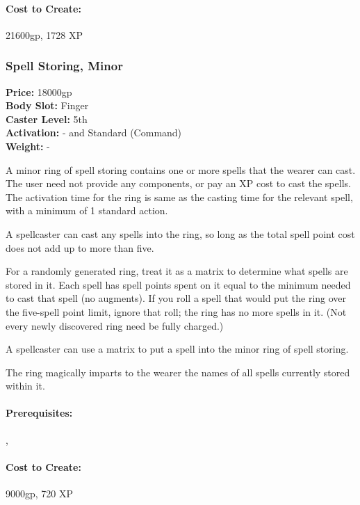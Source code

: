 \paragraph{Cost to Create:} 21600gp, 1728 XP
\subsubsection{Spell Storing, Minor}
\label{Item:SpellStoringMinor}
   \textbf{Price:} 18000gp
\\ \textbf{Body Slot:} Finger
\\ \textbf{Caster Level:} 5th
\\ \textbf{Activation:} - and Standard (Command)
\\ \textbf{Weight:} -

A minor ring of spell storing contains one or more spells that the wearer can cast.  
The user need not provide any components, or pay an XP cost to cast the spells. 
The activation time for the ring is same as the casting time for the relevant spell, with a minimum of 1 standard action.

A spellcaster can cast any spells into the ring, so long as the total spell point cost does not add up to more than five. 

For a randomly generated ring, treat it as a matrix to determine what spells are stored in it. Each spell has spell points spent on it equal to the minimum needed to cast that spell (no augments).
If you roll a spell that would put the ring over the five-spell point limit, ignore that roll; the ring has no more spells in it. (Not every newly discovered ring need be fully charged.)

A spellcaster can use a matrix to put a spell into the minor ring of spell storing.

The ring magically imparts to the wearer the names of all spells currently stored within it.


\paragraph{Prerequisites:} , 

\paragraph{Cost to Create:} 9000gp, 720 XP
